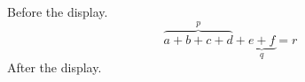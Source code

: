 \documentclass[12pt]{article}
\begin{document}
Before the display.
\[ \overbrace{a+b+c+d}^{p} + \underbrace{e+f}_{q} = r \]
After the display.
\end{document}
